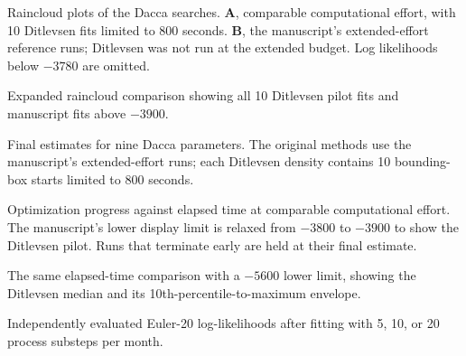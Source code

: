 
\caption{Raincloud plots of the Dacca searches. \textbf{A}, comparable
computational effort, with 10 Ditlevsen fits limited to 800 seconds.
\textbf{B}, the manuscript's extended-effort reference runs; Ditlevsen was
not run at the extended budget. Log likelihoods below $-3780$ are omitted.}

\caption{Expanded raincloud comparison showing all 10 Ditlevsen pilot
fits and manuscript fits above $-3900$.}

\caption{Final estimates for nine Dacca parameters. The original methods use
the manuscript's extended-effort runs; each Ditlevsen density contains 10
bounding-box starts limited to 800 seconds.}

\caption{Optimization progress against elapsed time at comparable
computational effort. The manuscript's lower display limit is relaxed from
$-3800$ to $-3900$ to show the Ditlevsen pilot. Runs that terminate early are
held at their final estimate.}

\caption{The same elapsed-time comparison with a $-5600$ lower limit, showing
the Ditlevsen median and its 10th-percentile-to-maximum envelope.}

\caption{Independently evaluated Euler-20 log-likelihoods after fitting with
5, 10, or 20 process substeps per month.}
